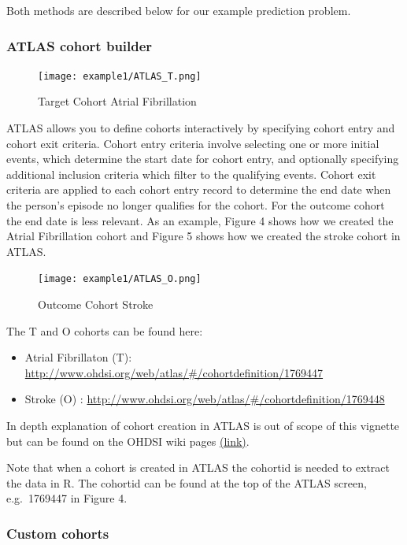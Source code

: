 \documentclass[
]{article}
\providecommand{\tightlist}{%
  \setlength{\itemsep}{0pt}\setlength{\parskip}{0pt}}
\begin{document}
Both methods are described below for our example prediction problem.

\hypertarget{atlas-cohort-builder}{%
\subsubsection{ATLAS cohort builder}\label{atlas-cohort-builder}}

\begin{figure}
\centering
\texttt{[image: example1/ATLAS\_T.png]}
\caption{Target Cohort Atrial Fibrillation}
\end{figure}

ATLAS allows you to define cohorts interactively by specifying cohort
entry and cohort exit criteria. Cohort entry criteria involve selecting
one or more initial events, which determine the start date for cohort
entry, and optionally specifying additional inclusion criteria which
filter to the qualifying events. Cohort exit criteria are applied to
each cohort entry record to determine the end date when the person's
episode no longer qualifies for the cohort. For the outcome cohort the
end date is less relevant. As an example, Figure 4 shows how we created
the Atrial Fibrillation cohort and Figure 5 shows how we created the
stroke cohort in ATLAS.

\begin{figure}
\centering
\texttt{[image: example1/ATLAS\_O.png]}
\caption{Outcome Cohort Stroke}
\end{figure}

The T and O cohorts can be found here:

\begin{itemize}
\tightlist
\item
  Atrial Fibrillaton (T):
  \url{http://www.ohdsi.org/web/atlas/\#/cohortdefinition/1769447}
\item
  Stroke (O) :
  \url{http://www.ohdsi.org/web/atlas/\#/cohortdefinition/1769448}
\end{itemize}

In depth explanation of cohort creation in ATLAS is out of scope of this
vignette but can be found on the OHDSI wiki pages
\href{http://www.ohdsi.org/web/wiki/doku.php?id=documentation:software:atlas}{(link)}.

Note that when a cohort is created in ATLAS the cohortid is needed to
extract the data in R. The cohortid can be found at the top of the ATLAS
screen, e.g.~1769447 in Figure 4.

\hypertarget{custom-cohorts}{%
\subsubsection{Custom cohorts}\label{custom-cohorts}}
\end{document}
